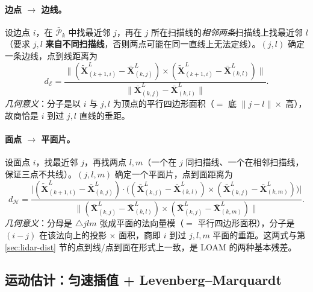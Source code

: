 \paragraph{边点 $\to$ 边线。}
设边点 $i$，在 $\bar{\mathcal{P}}_k$ 中找最近邻 $j$，再在 $j$ 所在扫描线的\emph{相邻两条}扫描线上找最近邻 $l$（要求 $j,l$ \textbf{来自不同扫描线}，否则两点可能在同一直线上无法定线）。$(j,l)$ 确定一条边线，点到线距离为
\begin{equation}
  d_{\mathcal{E}}=\frac{\big\|(\tilde{\mathbf{X}}^L_{(k+1,i)}-\bar{\mathbf{X}}^L_{(k,j)})\times(\tilde{\mathbf{X}}^L_{(k+1,i)}-\bar{\mathbf{X}}^L_{(k,l)})\big\|}{\big\|\bar{\mathbf{X}}^L_{(k,j)}-\bar{\mathbf{X}}^L_{(k,l)}\big\|}.
  \label{eq:lidar-loam-de}
\end{equation}
\emph{几何意义}：分子是以 $i$ 与 $j,l$ 为顶点的平行四边形面积（$=$ 底 $\|j-l\|\times$ 高），故商恰是 $i$ 到过 $j,l$ 直线的垂距。

\paragraph{面点 $\to$ 平面片。}
设面点 $i$，找最近邻 $j$，再找两点 $l,m$（一个在 $j$ 同扫描线、一个在相邻扫描线，保证三点不共线）。$(j,l,m)$ 确定一个平面片，点到面距离为
\begin{equation}
  d_{\mathcal{H}}=\frac{\big|(\tilde{\mathbf{X}}^L_{(k+1,i)}-\bar{\mathbf{X}}^L_{(k,j)})\cdot\big((\bar{\mathbf{X}}^L_{(k,j)}-\bar{\mathbf{X}}^L_{(k,l)})\times(\bar{\mathbf{X}}^L_{(k,j)}-\bar{\mathbf{X}}^L_{(k,m)})\big)\big|}{\big\|(\bar{\mathbf{X}}^L_{(k,j)}-\bar{\mathbf{X}}^L_{(k,l)})\times(\bar{\mathbf{X}}^L_{(k,j)}-\bar{\mathbf{X}}^L_{(k,m)})\big\|}.
  \label{eq:lidar-loam-dh}
\end{equation}
\emph{几何意义}：分母是 $\triangle jlm$ 张成平面的法向量模（$=$ 平行四边形面积），分子是 $(i-j)$ 在该法向上的投影 $\times$ 面积，商即 $i$ 到过 $j,l,m$ 平面的垂距。这两式与第 \ref{sec:lidar-dist} 节的点到线/点到面在形式上一致，是 LOAM 的两种基本残差。

\subsection{运动估计：匀速插值 + Levenberg–Marquardt}
\label{sec:lidar-loam-motion}

